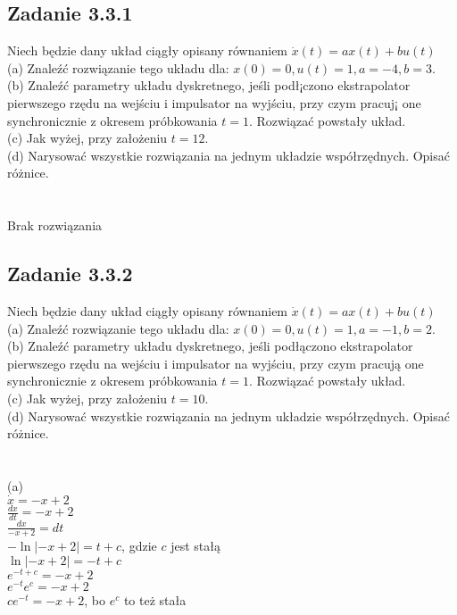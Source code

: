 \pagebreak
\subsection*{Zadanie 3.3.1} {\color{darkgray}
	Niech będzie dany układ ciągły opisany równaniem $\dot{x}(t)=ax(t)+bu(t)$\\
	(a) Znaleźć rozwiązanie tego układu dla: $x(0)=0, u(t)=1, a=-4, b=3$.\\
	(b) Znaleźć parametry układu dyskretnego, jeśli podł¡czono ekstrapolator pierwszego rzędu na wejściu
	i impulsator na wyjściu, przy czym pracuj¡ one synchronicznie z okresem próbkowania $t = 1$. 
	Rozwiązać powstały układ.\\
	(c) Jak wyżej, przy założeniu $t = 12$.\\
	(d) Narysować wszystkie rozwiązania na jednym układzie współrzędnych. Opisać różnice.\\
}\lineh
\\\\
Brak rozwiązania


\pagebreak
\subsection*{Zadanie 3.3.2} {\color{darkgray}
	Niech będzie dany układ ciągły opisany równaniem $\dot{x}(t)=ax(t)+bu(t)$\\
	(a) Znaleźć rozwiązanie tego układu dla: $x(0)=0, u(t)=1, a=-1, b=2$.\\
	(b) Znaleźć parametry układu dyskretnego, jeśli podłączono ekstrapolator pierwszego rzędu na wejściu
	i impulsator na wyjściu, przy czym pracują one synchronicznie z okresem próbkowania $t = 1$. 
	Rozwiązać powstały układ.\\
	(c) Jak wyżej, przy założeniu $t = 10$.\\
	(d) Narysować wszystkie rozwiązania na jednym układzie współrzędnych. Opisać różnice.\\
}\lineh
\\\\
(a)\\
$\dot{x}=-x+2$\\
$\frac{dx}{dt}=-x+2$\\
$\frac{dx}{-x+2}=dt$\\
$-\ln |-x+2|=t+c$, gdzie $c$ jest stałą \\
$\ln |-x+2|=-t+c$\\
$e^{-t+c}=-x+2$\\
$e^{-t}e^c=-x+2$\\
$ce^{-t}=-x+2$, bo $e^c$ to też stała\\

